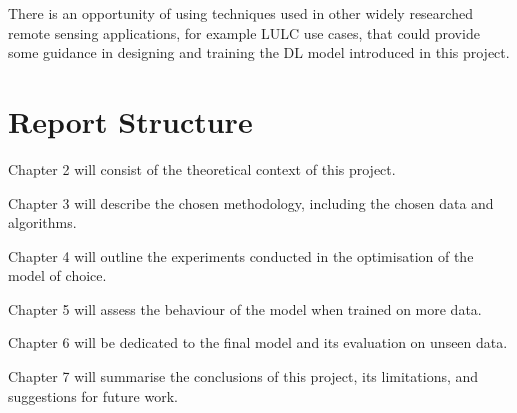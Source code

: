 There is an opportunity of using techniques used in other widely researched remote sensing applications, for example \gls{LULC} use cases, that could provide some guidance in designing and training the DL model introduced in this project.

\section{Report Structure} \label{report_struct}
\begin{inparaitem}[]
    \item Chapter 2 will consist of the theoretical context of this project. 
    \item Chapter 3 will describe the chosen methodology, including the chosen data and algorithms. 
    \item Chapter 4 will outline the experiments conducted in the optimisation of the model of choice.
    \item Chapter 5 will assess the behaviour of the model when trained on more data.
    \item Chapter 6 will be dedicated to the final model and its evaluation on unseen data.
    \item Chapter 7 will summarise the conclusions of this project, its limitations, and suggestions for future work.
\end{inparaitem}